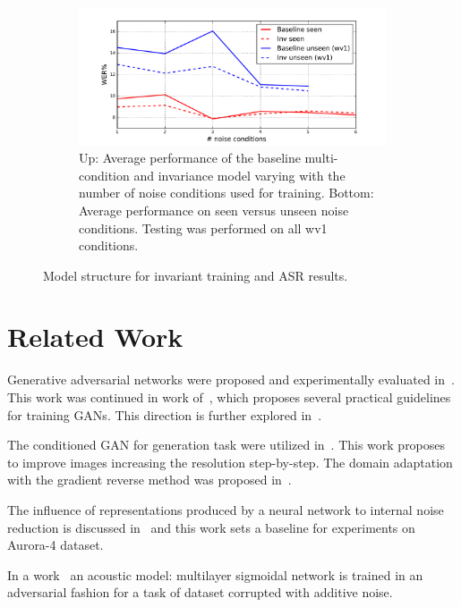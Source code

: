 \documentclass{article}
\begin{document}
\begin{figure}
\begin{subfigure}[b]{0.7\linewidth}
        \includegraphics[width=\linewidth]{wer_seen_unseen.pdf}
        \caption{Up: Average performance of the baseline multi-condition and invariance model varying with  the number of noise
            conditions used for training. Bottom: Average performance on seen versus unseen noise conditions.
            Testing was performed on all wv1 conditions.
            }
        \label{fig:results}
    \end{subfigure}
    \caption{Model structure for invariant training and ASR results.}
\end{figure}

\section{Related Work}
    Generative adversarial networks were proposed and experimentally evaluated 
    in~\cite{goodfellow2014generative}. This work was continued 
    in work of~\cite{radford2015unsupervised}, which proposes several practical guidelines
    for training GANs. This direction is further explored in~\cite{salimans2016improved}.

    The conditioned GAN for generation task were utilized in~\cite{denton2015deep}. This
    work proposes to improve images increasing the resolution step-by-step. 
    The domain adaptation with the gradient reverse method was proposed in~\cite{ganin2014unsupervised}.

    
    The influence of representations produced by a neural network to internal noise reduction 
    is discussed in~\cite{yu2013feature} and this work sets a baseline for experiments on
    Aurora-4 dataset.

    In a work~\cite{yusuke2016adversarial} an acoustic model: multilayer sigmoidal network is 
    trained in an adversarial fashion for a task of dataset corrupted with additive noise.
    
\end{document}
